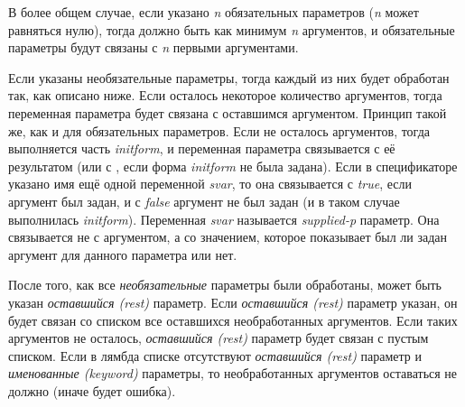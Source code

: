 В более общем случае, если указано \emph{n} обязательных параметров
(\emph{n} может равняться нулю), тогда должно быть как минимум \emph{n}
аргументов, и обязательные параметры будут связаны с \emph{n} первыми
аргументами.

Если указаны необязательные параметры, тогда каждый из них будет обработан так,
как описано ниже. Если осталось некоторое количество аргументов, тогда
переменная параметра  будет связана с оставшимся аргументом. Принцип
такой же, как и для обязательных параметров. Если не осталось аргументов, тогда
выполняется часть \emph{initform}, и переменная
параметра связывается с её результатом (или с {\false}, если форма
\emph{initform} не была задана).
Если в спецификаторе указано имя ещё одной переменной \emph{svar}, то она
связывается с \emph{true}, если аргумент был задан, и с \emph{false}
аргумент не был задан (и в таком случае выполнилась \emph{initform}).
Переменная \emph{svar} называется \emph{supplied-p} параметр. Она
связывается не с аргументом, а со значением, которое показывает был ли задан
аргумент для данного параметра или нет.

После того, как все \emph{необязательные} параметры были обработаны, может
быть указан \emph{оставшийся (rest)} параметр.
Если \emph{оставшийся (rest)} параметр указан, он будет связан со списком все
оставшихся необработанных аргументов. Если таких аргументов не осталось,
\emph{оставшийся (rest)} параметр будет связан с пустым списком. Если в лямбда
списке отсутствуют \emph{оставшийся (rest)} параметр и \emph{именованные
  (keyword)} параметры, то необработанных аргументов оставаться не должно (иначе
будет ошибка).

